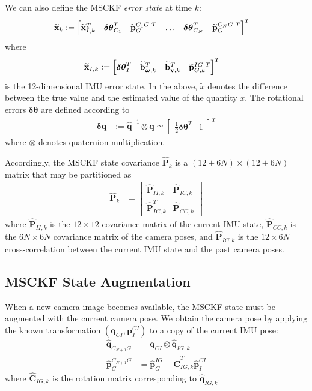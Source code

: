 \documentclass[letterpaper, 10 pt, conference]{ieeeconf}  %
\def\Vec#1{\mathbf{#1}}
\newcommand{\bbm}{\begin{bmatrix}}
\newcommand{\ebm}{\end{bmatrix}}
\begin{document}
We can also define the MSCKF  \textit{error state} at time $k$:
\begin{align*}
    \widetilde{\Vec{x}}_k &:= \bbm \widetilde{\Vec{x}}_{I,k}^T & \boldsymbol{\delta\theta}_{C_1}^T & \widetilde{\Vec{p}}_G^{C_1 G \hspace{0.3em} T} & \hdots & \boldsymbol{\delta\theta}_{C_N}^T & \widetilde{\Vec{p}}_G^{C_N G \hspace{0.3em} T} \ebm ^T
\end{align*}
where
\begin{align}
    \widetilde{\Vec{x}}_{I,k} &:= \bbm \boldsymbol{\delta\theta}_I^T & \widetilde{\Vec{b}}_{\boldsymbol{\omega},k}^T & \widetilde{\Vec{b}}_{\Vec{v},k}^T & \widetilde{\Vec{p}}_{G,k}^{IG \hspace{0.3em} T} \ebm^T
\end{align}
is the 12-dimensional IMU error state.
In the above, $\widetilde{x}$ denotes the difference between the true value and the estimated value of the quantity $x$.
The rotational errors $\boldsymbol{\delta\theta}$ are defined according to
\begin{align}
    \boldsymbol{\delta}\Vec{q} &:= \hat{\Vec{q}}^{-1} \otimes \Vec{q} \simeq \bbm \frac{1}{2}\boldsymbol{\delta\theta}^T & 1 \ebm^T
\end{align}
where $\otimes$ denotes quaternion multiplication.

Accordingly, the MSCKF state covariance $\hat{\Vec{P}}_k$ is a $(12+6N)\times(12+6N)$ matrix that may be partitioned as
\begin{align} \label{eq:covariance}
    \hat{\Vec{P}}_k &= \bbm \hat{\Vec{P}}_{II,k} & \hat{\Vec{P}}_{IC,k} \\ \hat{\Vec{P}}_{IC,k}^T & \hat{\Vec{P}}_{CC,k} \ebm
\end{align}
where $\hat{\Vec{P}}_{II,k}$ is the $12\times12$ covariance matrix of the current IMU state, $\hat{\Vec{P}}_{CC,k}$ is the $6N\times6N$ covariance matrix of the camera poses, and $\hat{\Vec{P}}_{IC,k}$ is the $12\times6N$ cross-correlation between the current IMU state and the past camera poses.

\subsection{MSCKF State Augmentation}
When a new camera image becomes available, the MSCKF state must be augmented with the current camera pose.
We obtain the camera pose by applying the known transformation $\left(\Vec{q}_{CI}, \Vec{p}_I^{CI}\right)$ to a copy of the current IMU pose:
\begin{align}
    \hat{\Vec{q}}_{C_{N+1} G} &= \Vec{q}_{CI} \otimes \hat{\Vec{q}}_{IG,k} \\
    \hat{\Vec{p}}_G^{C_{N+1}G} &= \hat{\Vec{p}}_G^{IG} + \hat{\Vec{C}}_{IG,k}^T \hat{\Vec{p}}_I^{CI}
\end{align}
where $\hat{\Vec{C}}_{IG,k}$ is the rotation matrix corresponding to $\hat{\Vec{q}}_{IG,k}$.
\end{document}
